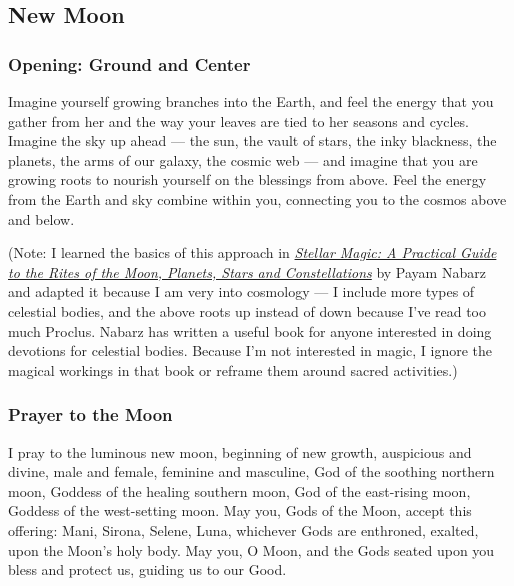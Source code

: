 \documentclass[
]{book}
\begin{document}
\hypertarget{new-moon}{%
\subsection{New Moon}\label{new-moon}}

\hypertarget{opening-ground-and-center}{%
\subsubsection{Opening: Ground and Center}\label{opening-ground-and-center}}

Imagine yourself growing branches into the Earth, and feel the energy that you gather from her and the way your leaves are tied to her seasons and cycles. Imagine the sky up ahead --- the sun, the vault of stars, the inky blackness, the planets, the arms of our galaxy, the cosmic web --- and imagine that you are growing roots to nourish yourself on the blessings from above. Feel the energy from the Earth and sky combine within you, connecting you to the cosmos above and below.

(Note: I learned the basics of this approach in \href{https://www.google.com/books/edition/Stellar_Magic/h6lsPgAACAAJ?hl=en}{\emph{Stellar Magic: A Practical Guide to the Rites of the Moon, Planets, Stars and Constellations}} by Payam Nabarz and adapted it because I am very into cosmology --- I include more types of celestial bodies, and the above roots up instead of down because I've read too much Proclus. Nabarz has written a useful book for anyone interested in doing devotions for celestial bodies. Because I'm not interested in magic, I ignore the magical workings in that book or reframe them around sacred activities.)

\hypertarget{prayer-to-the-moon}{%
\subsubsection{Prayer to the Moon}\label{prayer-to-the-moon}}

I pray to the luminous new moon,
beginning of new growth,
auspicious and divine,
male and female, feminine and masculine,
God of the soothing northern moon,
Goddess of the healing southern moon,
God of the east-rising moon,
Goddess of the west-setting moon.
May you, Gods of the Moon, accept this offering:
Mani, Sirona, Selene, Luna, whichever Gods are
enthroned, exalted, upon the Moon's holy body.
May you, O Moon, and the Gods seated upon you
bless and protect us, guiding us to our Good.
\end{document}
